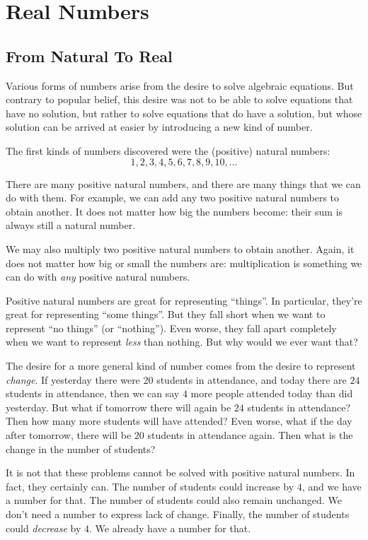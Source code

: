 \documentclass[a4paper,10pt]{report}
\begin{document}
\chapter{Real Numbers}

\section{From Natural To Real}

Various forms of numbers arise from the desire to solve algebraic equations. But
contrary to popular belief, this desire was not to be able to solve equations
that have no solution, but rather to solve equations that do have a solution,
but whose solution can be arrived at easier by introducing a new kind of number.

The first kinds of numbers discovered were the (positive) natural numbers: \[ 1,
2, 3, 4, 5, 6, 7, 8, 9, 10, \dots \]

There are many positive natural numbers, and there are many things that we can
do with them. For example, we can add any two positive natural numbers to obtain
another. It does not matter how big the numbers become: their sum is always
still a natural number.

We may also multiply two positive natural numbers to obtain another. Again, it
does not matter how big or small the numbers are: multiplication is something
we can do with \emph{any} positive natural numbers.

Positive natural numbers are great for representing ``things''. In particular,
they're great for representing ``some things''. But they fall short when we want
to represent ``no things'' (or ``nothing''). Even worse, they fall apart
completely when we want to represent \emph{less} than nothing. But why would we
ever want that?

The desire for a more general kind of number comes from the desire to represent
\emph{change}. If yesterday there were $20$ students in attendance, and today
there are $24$ students in attendance, then we can say $4$ more people attended
today than did yesterday. But what if tomorrow there will again be $24$ students
in attendance? Then how many more students will have attended? Even worse, what
if the day after tomorrow, there will be $20$ students in attendance again. Then
what is the change in the number of students?

It is not that these problems cannot be solved with positive natural numbers. In
fact, they certainly can. The number of students could increase by $4$, and we
have a number for that. The number of students could also remain unchanged. We
don't need a number to express lack of change. Finally, the number of students
could \emph{decrease} by $4$. We already have a number for that.
\end{document}
